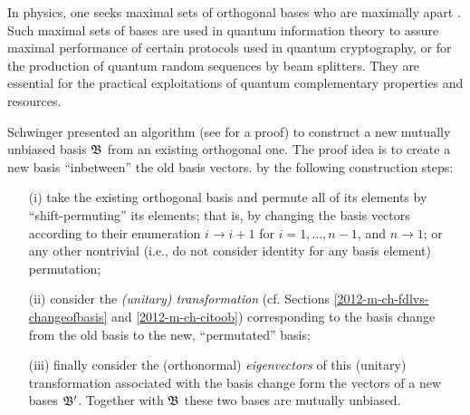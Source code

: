 {\color{Purple}
In physics, one seeks maximal sets of orthogonal bases who
are maximally apart \cite{WooFie,durt} .
Such maximal sets of bases are used in quantum information theory
to assure maximal performance of certain protocols
used in quantum cryptography, or for the production of
quantum random sequences by beam splitters.
They are essential for the practical exploitations of quantum complementary properties
and resources.
}



Schwinger presented an algorithm (see \cite{Schwinger.60} for a proof)
to construct a new mutually unbiased basis ${\frak B}$   from an existing orthogonal one.
The proof idea
is to create a new basis ``inbetween'' the old basis vectors.
by the following construction steps:
\begin{itemize}
\item[(i)]
take the existing orthogonal basis and permute all of its elements by ``shift-permuting'' its elements; that is, by
changing
the basis vectors according to their enumeration $i \rightarrow i+1$ for $i=1,\ldots , n-1$, and $n \rightarrow 1$;
or any other nontrivial (i.e., do not consider identity for any basis element) permutation;
\item[(ii)]
consider the {\em (unitary) transformation} (cf. Sections \ref{2012-m-ch-fdlvs-changeofbasis} and \ref{2012-m-ch-citoob})
corresponding to the basis change from the old basis to the new, ``permutated'' basis;
\item[(iii)]
finally consider the (orthonormal) {\em eigenvectors}    of this (unitary) transformation associated with the basis change
form the vectors of a new bases  ${\frak B}'$.
Together with ${\frak B}$ these two bases are mutually unbiased.
\end{itemize}

